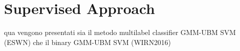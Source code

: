 \chapter{Supervised Approach}
qua vengono presentati sia il metodo multilabel classifier GMM-UBM SVM (ESWN) che 
il binary  GMM-UBM SVM (WIRN2016)

